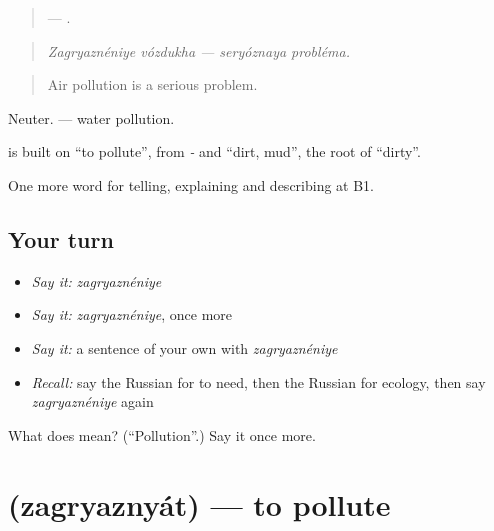 \begin{quote}
  —  .
\end{quote}

\begin{quote}
\emph{Zagryaznéniye vózdukha — seryóznaya probléma.}
\end{quote}

\begin{quote}
Air pollution is a serious problem.
\end{quote}

Neuter. \emph{ } — water pollution.

\begin{cousinweb}
\textbf{} is built on \emph{} \textquotedblleft{}to pollute\textquotedblright{}, from \emph{-} and \emph{} \textquotedblleft{}dirt, mud\textquotedblright{}, the root of \emph{} \textquotedblleft{}dirty\textquotedblright{}.
\end{cousinweb}

\begin{grammarlens}[title={What you've built}]
One more word for telling, explaining and describing at B1.
\end{grammarlens}

\subsection*{Your turn}
\begin{itemize}
\raggedright
  \item \emph{Say it:} \emph{zagryaznéniye}
  \item \emph{Say it:} \emph{zagryaznéniye}, once more
  \item \emph{Say it:} a sentence of your own with \emph{zagryaznéniye}
  \item \emph{Recall:} say the Russian for to need, then the Russian for ecology, then say \emph{zagryaznéniye} again
\end{itemize}

\begin{tcolorbox}[breakable,colback=teal!4,colframe=teal!35!black,title={Before you move on}]
What does  mean? (\textquotedblleft{}Pollution\textquotedblright{}.) Say it once more.
\end{tcolorbox}
\section[\texorpdfstring{\ru{загрязнять} (zagryaznyát)}{загрязнять (zagryaznyát)}]{ (zagryaznyát) — to pollute}

